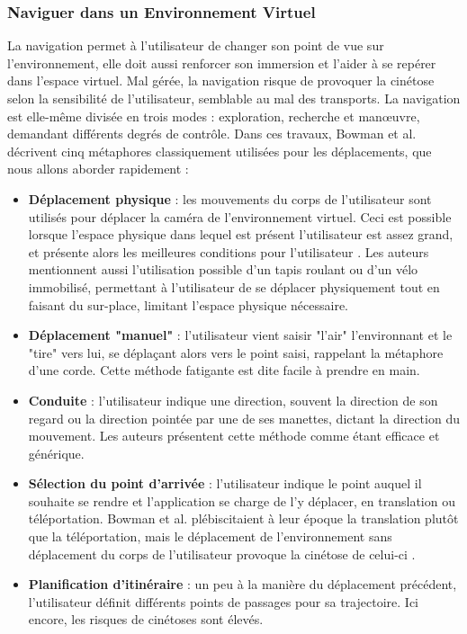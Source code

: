 	\subsubsection{Naviguer dans un Environnement Virtuel}
		La navigation permet à l'utilisateur de changer son point de vue sur l'environnement, elle doit aussi renforcer son immersion et l'aider à se repérer dans l'espace virtuel. Mal gérée, la navigation risque de provoquer la cinétose selon la sensibilité de l'utilisateur, semblable au mal des transports. La navigation est elle-même divisée en trois modes : exploration, recherche et manœuvre, demandant différents degrés de contrôle. Dans ces travaux, Bowman et al. décrivent cinq métaphores classiquement utilisées pour les déplacements, que nous allons aborder rapidement :
		\begin{itemize}
		\item \textbf{Déplacement physique} : les mouvements du corps de l'utilisateur sont utilisés pour déplacer la caméra de l'environnement virtuel. Ceci est possible lorsque l'espace physique dans lequel est présent l'utilisateur est assez grand, et présente alors les meilleures conditions pour l'utilisateur \cite{cherep_spatial_2020}. Les auteurs mentionnent aussi l'utilisation possible d'un tapis roulant ou d'un vélo immobilisé, permettant à l'utilisateur de se déplacer physiquement tout en faisant du sur-place, limitant l'espace physique nécessaire.
		\item \textbf{Déplacement "manuel"} : l'utilisateur vient saisir "l'air" l'environnant et le "tire" vers lui, se déplaçant alors vers le point saisi, rappelant la métaphore d'une corde. Cette méthode fatigante est dite facile à prendre en main.
		\item \textbf{Conduite} : l'utilisateur indique une direction, souvent la direction de son regard ou la direction pointée par une de ses manettes, dictant la direction du mouvement. Les auteurs présentent cette méthode comme étant efficace et générique. 
		\item \textbf{Sélection du point d'arrivée} : l'utilisateur indique le point auquel il souhaite se rendre et l'application se charge de l'y déplacer, en translation ou téléportation. Bowman et al. plébiscitaient à leur époque la translation plutôt que la téléportation, mais le déplacement de l'environnement sans déplacement du corps de l'utilisateur provoque la cinétose de celui-ci \cite{cherep_spatial_2020}.
		\item \textbf{Planification d'itinéraire} : un peu à la manière du déplacement précédent, l'utilisateur définit différents points de passages pour sa trajectoire. Ici encore, les risques de cinétoses sont élevés.
		\end{itemize}
		
